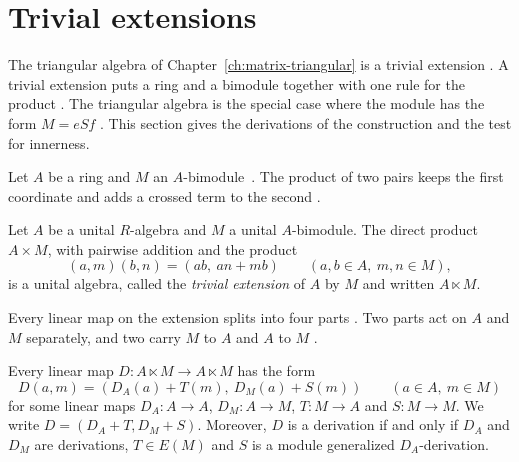 \section{Trivial extensions}\label{sec:path-incidence:trivial-extension}

The triangular algebra of Chapter~\ref{ch:matrix-triangular} is a trivial
extension \cite[p.~5]{BennisFahid2017}. A trivial extension puts a ring and a
bimodule together with one rule for the product \cite[p.~4]{BennisFahid2017}.
The triangular algebra is the special case where the module has the form
$M=eSf$ \cite[p.~5]{BennisFahid2017}. This section gives the derivations of
the construction and the test for innerness.

Let $A$ be a ring and $M$ an $A$-bimodule~\cite[p.~4]{BennisFahid2017}. The product of two pairs keeps the
first coordinate and adds a crossed term to the second
\cite[p.~4]{BennisFahid2017}.

\begin{definition}\label{def:trivial:extension}
Let $A$ be a unital $R$-algebra and $M$ a unital $A$-bimodule. The direct product
$A\times M$, with pairwise addition and the product
\begin{equation*}
(a,m)(b,n)=(ab,\ an+mb)\qquad(a,b\in A,\ m,n\in M),
\end{equation*}
is a unital algebra, called the \emph{trivial extension} of $A$ by $M$ and written
$A\ltimes M$.
\end{definition}

Every linear map on the extension splits into four parts
\cite[p.~8]{BennisFahid2017}. Two parts act on $A$ and $M$ separately, and two
carry $M$ to $A$ and $A$ to $M$ \cite[p.~8]{BennisFahid2017}.

\begin{lemma}\label{lem:trivial:form}
Every linear map $D\colon A\ltimes M\to A\ltimes M$ has the form
\begin{equation*}
D(a,m)=(D_{A}(a)+T(m),\ D_{M}(a)+S(m))\qquad(a\in A,\ m\in M)
\end{equation*}
for some linear maps $D_{A}\colon A\to A$, $D_{M}\colon A\to M$, $T\colon M\to A$ and
$S\colon M\to M$. We write $D=(D_{A}+T,D_{M}+S)$.
Moreover, $D$ is a derivation if and only if $D_{A}$ and $D_{M}$ are derivations,
$T\in E(M)$ and $S$ is a module generalized $D_{A}$-derivation.
\end{lemma}

